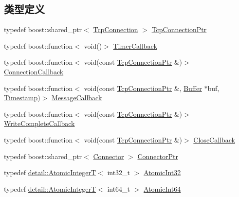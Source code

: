 \subsection*{类型定义}
\begin{DoxyCompactItemize}
\item 
typedef boost\+::shared\+\_\+ptr$<$ \hyperlink{classmuduo_1_1TcpConnection}{Tcp\+Connection} $>$ \hyperlink{namespacemuduo_a40c45128e9700d337d92f3cbb8dd4a0a}{Tcp\+Connection\+Ptr}
\item 
typedef boost\+::function$<$ void()$>$ \hyperlink{namespacemuduo_a5f7453c2a15825e79bddf5deaec707bf}{Timer\+Callback}
\item 
typedef boost\+::function$<$ void(const \hyperlink{namespacemuduo_a40c45128e9700d337d92f3cbb8dd4a0a}{Tcp\+Connection\+Ptr} \&)$>$ \hyperlink{namespacemuduo_ac7f7b0c9c9e96123dfea3fe120a2c404}{Connection\+Callback}
\item 
typedef boost\+::function$<$ void(const \hyperlink{namespacemuduo_a40c45128e9700d337d92f3cbb8dd4a0a}{Tcp\+Connection\+Ptr} \&, \hyperlink{classmuduo_1_1Buffer}{Buffer} $\ast$buf, \hyperlink{classmuduo_1_1Timestamp}{Timestamp})$>$ \hyperlink{namespacemuduo_ab8a96fa483cffe150618e01058e6fc1b}{Message\+Callback}
\item 
typedef boost\+::function$<$ void(const \hyperlink{namespacemuduo_a40c45128e9700d337d92f3cbb8dd4a0a}{Tcp\+Connection\+Ptr} \&)$>$ \hyperlink{namespacemuduo_a605eda27d048a69607942b95735d7087}{Write\+Complete\+Callback}
\item 
typedef boost\+::function$<$ void(const \hyperlink{namespacemuduo_a40c45128e9700d337d92f3cbb8dd4a0a}{Tcp\+Connection\+Ptr} \&)$>$ \hyperlink{namespacemuduo_ab2469aa3fe08794ee43a3d8f69bff30f}{Close\+Callback}
\item 
typedef boost\+::shared\+\_\+ptr$<$ \hyperlink{classmuduo_1_1Connector}{Connector} $>$ \hyperlink{namespacemuduo_a144f8adea97b4c9ac75c439f6d87ae29}{Connector\+Ptr}
\item 
typedef \hyperlink{classmuduo_1_1detail_1_1AtomicIntegerT}{detail\+::\+Atomic\+IntegerT}$<$ int32\+\_\+t $>$ \hyperlink{namespacemuduo_a5ff4a046f03836ad4fb080652d419987}{Atomic\+Int32}
\item 
typedef \hyperlink{classmuduo_1_1detail_1_1AtomicIntegerT}{detail\+::\+Atomic\+IntegerT}$<$ int64\+\_\+t $>$ \hyperlink{namespacemuduo_aa79d31350742dfc80edb0d9a5df0e7e7}{Atomic\+Int64}
\end{DoxyCompactItemize}
